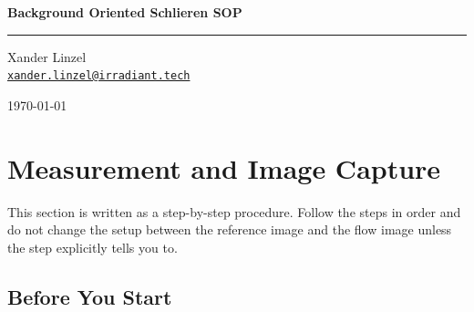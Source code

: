 \documentclass[11pt]{article}
\begin{document}
\begin{titlepage}
  \centering
  \vspace*{8cm}
  {\Huge\bfseries Background Oriented Schlieren SOP\par}
  \vspace{2em}
  \hrule
  \vspace{1.5em}
  {\large Xander Linzel\\
   \href{mailto:xander.linzel@irradiant.tech}{\texttt{xander.linzel@irradiant.tech}}\par}
  \vspace{1em}
  {\normalsize \today\par}

  \vspace*{8cm}
  
\end{titlepage}

    \tableofcontents

  \vspace*{1cm}
  

\section{Measurement and Image Capture}

This section is written as a step-by-step procedure. Follow the steps in order and do not change the setup between the reference image and the flow image unless the step explicitly tells you to.

\subsection{Before You Start}
\end{document}
